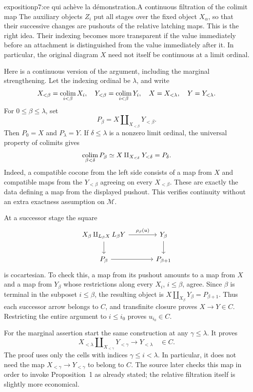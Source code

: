 \begin{dcomment}{exposition}{p7:ce qui achève la démonstration.}{A continuous filtration of the colimit map}
The auxiliary objects $Z_i$ put all stages over the fixed object $X_\alpha$, so that their successive changes are pushouts of the relative latching maps. This is the right idea. Their indexing becomes more transparent if the value immediately before an attachment is distinguished from the value immediately after it. In particular, the original diagram $X$ need not itself be continuous at a limit ordinal.

Here is a continuous version of the argument, including the marginal strengthening. Let the indexing ordinal be $\lambda$, and write
\[
 X_{<\beta}=\mathop{\rm colim}_{i<\beta}X_i,
 \quad Y_{<\beta}=\mathop{\rm colim}_{i<\beta}Y_i,
 \quad X=X_{<\lambda},\quad Y=Y_{<\lambda}.
\]
For $0\leq\beta\leq\lambda$, set
\[
 P_\beta=X\amalg_{X_{<\beta}}Y_{<\beta}.
\]
Then $P_0=X$ and $P_\lambda=Y$. If $\delta\leq\lambda$ is a nonzero limit ordinal, the universal property of colimits gives
\[
 \mathop{\rm colim}_{\beta<\delta}P_\beta
 \simeq X\amalg_{X_{<\delta}}Y_{<\delta}=P_\delta.
\]
Indeed, a compatible cocone from the left side consists of a map from $X$ and compatible maps from the $Y_{<\beta}$ agreeing on every $X_{<\beta}$. These are exactly the data defining a map from the displayed pushout. This verifies continuity without an extra exactness assumption on $\mathcal M$.

At a successor stage the square
\[
\begin{tikzcd}[column sep=large]
X_\beta\amalg_{L_\beta X}L_\beta Y
 \arrow[r,"\rho_\beta(u)"]\arrow[d]
 &Y_\beta\arrow[d]\\
P_\beta\arrow[r]&P_{\beta+1}
\end{tikzcd}
\]
is cocartesian. To check this, a map from its pushout amounts to a map from $X$ and a map from $Y_\beta$ whose restrictions along every $X_i$, $i\leq\beta$, agree. Since $\beta$ is terminal in the subposet $i\leq\beta$, the resulting object is $X\amalg_{X_\beta}Y_\beta=P_{\beta+1}$. Thus each successor arrow belongs to $C$, and transfinite closure proves $X\to Y\in C$. Restricting the entire argument to $i\leq i_0$ proves $u_{i_0}\in C$.

For the marginal assertion start the same construction at any $\gamma\leq\lambda$. It proves
\[
 X_{<\lambda}\amalg_{X_{<\gamma}}Y_{<\gamma}
       \longrightarrow Y_{<\lambda}\quad\in C.
\]
The proof uses only the cells with indices $\gamma\leq i<\lambda$. In particular, it does not need the map $X_{<\gamma}\to Y_{<\gamma}$ to belong to $C$. The source later checks this map in order to invoke Proposition~1 as already stated; the relative filtration itself is slightly more economical.


\end{dcomment}
